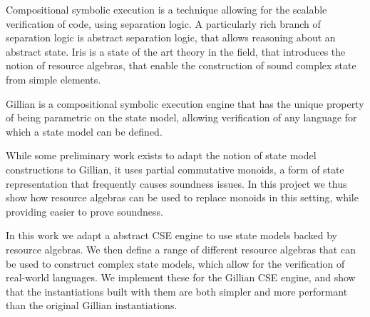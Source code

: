 Compositional symbolic execution is a technique allowing for the scalable verification of code, using separation logic. A particularly rich branch of separation logic is abstract separation logic, that allows reasoning about an abstract state. Iris is a state of the art theory in the field, that introduces the notion of resource algebras, that enable the construction of sound complex state from simple elements.

Gillian is a compositional symbolic execution engine that has the unique property of being parametric on the state model, allowing verification of any language for which a state model can be defined.

While some preliminary work exists to adapt the notion of state model constructions to Gillian, it uses partial commutative monoids, a form of state representation that frequently causes soundness issues. In this project we thus show how resource algebras can be used to replace monoids in this setting, while providing easier to prove soundness.

In this work we adapt a abstract CSE engine to use state models backed by resource algebras. We then define a range of different resource algebras that can be used to construct complex state models, which allow for the verification of real-world languages. We implement these for the Gillian CSE engine, and show that the instantiations built with them are both simpler and more performant than the original Gillian instantiations.
